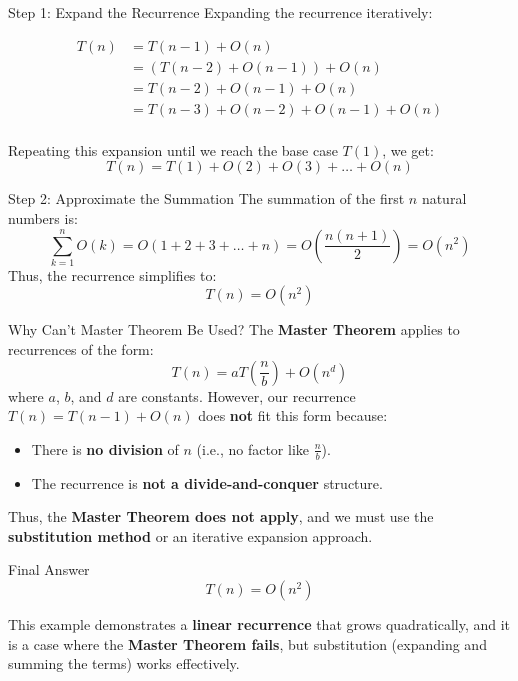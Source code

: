 \documentclass{beamer}
\begin{document}
\begin{frame}{Step 1: Expand the Recurrence}
    Expanding the recurrence iteratively:

    \begin{equation*}
        \begin{align*}
            T(n) &= T(n-1) + O(n) \\
                 &= (T(n-2) + O(n-1)) + O(n) \\
                 &= T(n-2) + O(n-1) + O(n) \\
                 &= T(n-3) + O(n-2) + O(n-1) + O(n) \\
        \end{align*}
    \end{equation*}

    Repeating this expansion until we reach the base case $T(1)$, we get:
    $$
        T(n) = T(1) + O(2) + O(3) + \dots + O(n)
    $$
\end{frame}

\begin{frame}{Step 2: Approximate the Summation}
    The summation of the first $n$ natural numbers is:
    $$
        \sum_{k=1}^{n} O(k) = O(1 + 2 + 3 + \dots + n) = O\left(\frac{n(n + 1)}{2}\right) = O(n^2)
    $$
    Thus, the recurrence simplifies to:
    $$
        T(n) = O(n^2)
    $$
\end{frame}

\begin{frame}{Why Can't Master Theorem Be Used?}
    The \textbf{Master Theorem} applies to recurrences of the form:
    $$
        T(n) = aT\left(\frac{n}{b}\right) + O(n^d)
    $$
    where $a$, $b$, and $d$ are constants. However, our recurrence $T(n) = T(n-1) + O(n)$ does \textbf{not} fit this form because:

    \begin{itemize}
        \item There is \textbf{no division} of $n$ (i.e., no factor like $\frac{n}{b}$).
        \item The recurrence is \textbf{not a divide-and-conquer} structure.
    \end{itemize}
    Thus, the \textbf{Master Theorem does not apply}, and we must use the \textbf{substitution method} or an iterative expansion approach.
\end{frame}

\begin{frame}{Final Answer}
    $$
        T(n) = O(n^2)
    $$

    This example demonstrates a \textbf{linear recurrence} that grows quadratically, and it is a case where the \textbf{Master Theorem fails}, but substitution (expanding and summing the terms) works effectively.
\end{frame}
\end{document}
